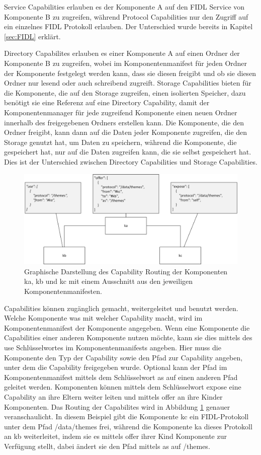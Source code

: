 \documentclass[a4paper]{scrartcl}
\begin{document}
Service Capabilities erlauben es der Komponente A auf den FIDL Service von Komponente B zu zugreifen, während Protocol Capabilities nur den Zugriff auf ein einzelnes FIDL Protokoll erlauben. Der Unterschied wurde bereits in Kapitel \ref{sec:FIDL} erklärt.

Directory Capabilites erlauben es einer Komponente A auf einen Ordner der Komponente B zu zugreifen, wobei im Komponentenmanifest für jeden Ordner der Komponente festgelegt werden kann, dass sie diesen freigibt und ob sie diesen Ordner nur lesend oder auch schreibend zugreift. Storage Capabilities bieten für die Komponente, die auf den Storage zugreifen, einen isolierten Speicher, dazu benötigt sie eine Referenz auf eine Directory Capability, damit der Komponentenmanager für jede zugreifend Komponente einen neuen Ordner innerhalb des freigegebenen Ordners erstellen kann. Die Komponente, die den Ordner freigibt, kann dann auf die Daten jeder Komponente zugreifen, die den Storage genutzt hat, um Daten zu speichern, während die Komponente, die gespeichert hat, nur auf die Daten zugreifen kann, die sie selbst gespeichert hat. Dies ist der Unterschied zwischen Directory Capabilities und Storage Capabilities.
\begin{figure}
	\centering
	\includegraphics[width=1\textwidth]{figure/Capability_Routing}
	\caption[Kurzform vom Bild]{Graphische Darstellung des Capability Routing der Komponenten ka, kb und kc mit einem Ausschnitt aus den jeweiligen Komponentenmanifesten.}
	\label{abb:capabilityRouting}
\end{figure}
Capabilities können zugänglich gemacht, weitergeleitet und benutzt werden. Welche Komponente was mit welcher Capability macht, wird im Komponentenmanifest der Komponente angegeben. Wenn eine Komponente die Capabilities einer anderen Komponente nutzen möchte, kann sie dies mittels des use Schlüsselwortes im Komponentenmanifests angeben. Hier muss die Komponente den Typ der Capability sowie den Pfad zur Capability angeben, unter dem die Capability freigegeben wurde. Optional kann der Pfad im Komponentenmanifest mittels dem Schlüsselwort as auf einen anderen Pfad geleitet werden. Komponenten können mittels dem Schlüsselwort expose eine Capability an ihre Eltern weiter leiten und mittels offer an ihre Kinder Komponenten. Das Routing der Capabilites wird in Abbildung \ref{abb:capabilityRouting} genauer veranschaulicht. In diesem Beispiel gibt die Komponente kc ein FIDL-Protokoll unter dem Pfad /data/themes frei, während die Komponente ka dieses Protokoll an kb weiterleitet, indem sie es mittels offer ihrer Kind Komponente zur Verfügung stellt, dabei ändert sie den Pfad mittels as auf /themes. 
\end{document}
